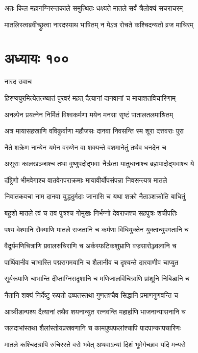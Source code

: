 \twolineshloka
{अतः किल महानग्निरन्तकाले समुत्थितः}
{धक्ष्यते मातले सर्वं त्रैलोक्यं सचराचरम्}


\twolineshloka
{मातलिस्त्वब्रवीच्छ्रुत्वा नारदस्याथ भाषितम्}
{न मेऽत्र रोचते कश्चिदन्यतो व्रज माचिरम्}


\chapter{अध्यायः १००}
\twolineshloka
{नारद उवाच}
{}


\twolineshloka
{हिरण्यपुरमित्येतत्ख्यातं पुरवरं महत्}
{दैत्यानां दानवानां च मायाशतविचारिणाम्}


\twolineshloka
{अनल्पेन प्रयत्नेन निर्मितं विश्वकर्मणा}
{मयेन मनसा सृष्टं पातालतलमाश्रितम्}


\twolineshloka
{अत्र मायासहस्राणि वविकुर्वाणा महौजसः}
{दानवा निवसन्ति स्म शूरा दत्तवराः पुरा}


\twolineshloka
{नैते शक्रेण नान्येन यमेन वरुणेन वा}
{शक्यन्ते वशमानेतुं तथैव धनदेन च}


\twolineshloka
{असुराः कालखञ्जाश्च तथा वुष्णुपदोद्भवाः}
{नैर्ऋता यातुधानाश्च ब्रह्मपादोद्भवाश्च ये}


\twolineshloka
{दंष्ट्रिणो भीमवेगाश्च वातवेगपराक्रमाः}
{मायावीर्योपसंपन्ना निवसन्त्यत्र मातले}


\twolineshloka
{निवातकवचा नाम दानवा युद्धदुर्मदाः}
{जानासि च यथा शक्रो नैताञ्शक्रोति बाधितुं}


\twolineshloka
{बहुशो मातले त्वं च तव पुत्रश्च गोमुखः}
{निर्भग्नो देवराजश्च सहपुत्रः शचीपतिः}


\twolineshloka
{पश्य वेश्मानि रौक्माणि मातले राजतानि च}
{कर्मणा विधियुक्तेन युक्तान्युपगतानि च}


\twolineshloka
{वैदूर्यमणिचित्राणि प्रवालरुचिराणि च}
{अर्कस्फटिकशुभ्राणि वज्रसारोञ्ज्वलानि च}


\twolineshloka
{पार्थिवानीव चाभास्ति पद्मरागमयानि च}
{शैलानीव च दृश्यन्ते दारवाणीव चाप्युत}


\twolineshloka
{सूर्यरूपाणि चाभान्ति दीप्ताग्निसदृशानि च}
{मणिजालविचित्राणि प्रांशूनि निबिडानि च}


\twolineshloka
{नैतानि शक्यं निर्देष्टु रूपतो द्रव्यतस्तथा}
{गुणतश्चैव सिद्धानि प्रमाणगुणवन्ति च}


\twolineshloka
{आक्रीडान्पश्य दैत्यानां तथैव शयनान्युत}
{रत्नवन्ति महार्हाणि भाजनान्यासनानि च}


\twolineshloka
{जलदाभांस्तथा शैलांस्तोयप्रस्रवणानि च}
{कामपुष्पफलांश्चापि पादपान्कापचारिणः}


\twolineshloka
{मातले कश्चिदत्रापि रुचिरस्ते वरो भवेत्}
{अथवाऽन्यां दिशं भूमेर्गच्छाव यदि मन्यसे}


